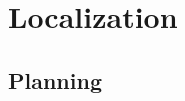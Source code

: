 \chapter{Localization}



\label{LastMainPage}


\newpage
\clearpage

\begin{appendices}
\makeatletter
{}
\makeatother
\chapter{Planning}
%


\end{appendices}

